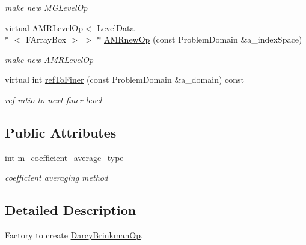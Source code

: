 \begin{DoxyCompactItemize}
\begin{DoxyCompactList}\small\item\em make new M\-G\-Level\-Op \end{DoxyCompactList}\item 
\hypertarget{class_darcy_brinkman_op_factory_a82a0943e3ec0acaa1954c1f4c3e3bfa7}{virtual A\-M\-R\-Level\-Op$<$ Level\-Data\\*
$<$ F\-Array\-Box $>$ $>$ $\ast$ \hyperlink{class_darcy_brinkman_op_factory_a82a0943e3ec0acaa1954c1f4c3e3bfa7}{A\-M\-Rnew\-Op} (const Problem\-Domain \&a\-\_\-index\-Space)}\label{class_darcy_brinkman_op_factory_a82a0943e3ec0acaa1954c1f4c3e3bfa7}

\begin{DoxyCompactList}\small\item\em make new A\-M\-R\-Level\-Op \end{DoxyCompactList}\item 
\hypertarget{class_darcy_brinkman_op_factory_a416f30542290000a01ccf209fabd5646}{virtual int \hyperlink{class_darcy_brinkman_op_factory_a416f30542290000a01ccf209fabd5646}{ref\-To\-Finer} (const Problem\-Domain \&a\-\_\-domain) const }\label{class_darcy_brinkman_op_factory_a416f30542290000a01ccf209fabd5646}

\begin{DoxyCompactList}\small\item\em ref ratio to next finer level \end{DoxyCompactList}\end{DoxyCompactItemize}
\subsection*{Public Attributes}
\begin{DoxyCompactItemize}
\item 
\hypertarget{class_darcy_brinkman_op_factory_a02ce1a05ae4fba39abdc0c37ebd8afd8}{int \hyperlink{class_darcy_brinkman_op_factory_a02ce1a05ae4fba39abdc0c37ebd8afd8}{m\-\_\-coefficient\-\_\-average\-\_\-type}}\label{class_darcy_brinkman_op_factory_a02ce1a05ae4fba39abdc0c37ebd8afd8}

\begin{DoxyCompactList}\small\item\em coefficient averaging method \end{DoxyCompactList}\end{DoxyCompactItemize}


\subsection{Detailed Description}
Factory to create \hyperlink{class_darcy_brinkman_op}{Darcy\-Brinkman\-Op}. 

